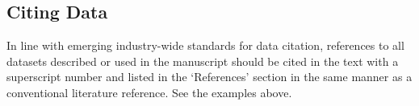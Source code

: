 \documentclass[a4paper,10pt,english]{article}
\begin{document}
\subsection*{Citing Data}
In line with emerging industry-wide standards for data citation, references to all datasets described or used in the manuscript should be cited in the text with a superscript number and listed in the ‘References’ section in the same manner as a conventional literature reference. See the examples above.
\end{document}
